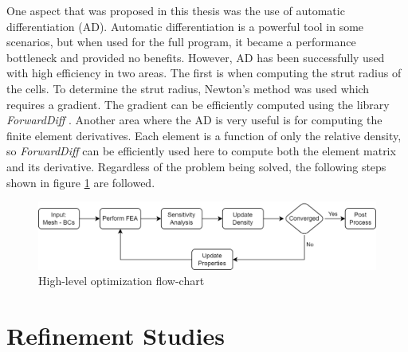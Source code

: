 One aspect that was proposed in this thesis was the use of automatic differentiation (AD). Automatic differentiation is a powerful tool in some scenarios, but when used for the full program, it became a performance bottleneck and provided no benefits. However, AD has been successfully used with high efficiency in two areas. The first is when computing the strut radius of the cells. To determine the strut radius, Newton's method was used which requires a gradient. The gradient can be efficiently computed using the library \emph{ForwardDiff} \cite{RevelsLubinPapamarkou2016}. Another area where the AD is very useful is for computing the finite element derivatives. Each element is a function of only the relative density, so \emph{ForwardDiff} \cite{RevelsLubinPapamarkou2016} can be efficiently used here to compute both the element matrix and its derivative. Regardless of the problem being solved, the following steps shown in figure \ref{fig:optimization_flowchart} are followed.
\begin{figure}[ht]
  \centering
  \includegraphics[width=0.9\linewidth]{figures/chapter_4/OptimizationFlowchart.png}
  \caption{High-level optimization flow-chart}
  \label{fig:optimization_flowchart}
\end{figure}


\section{Refinement Studies}
